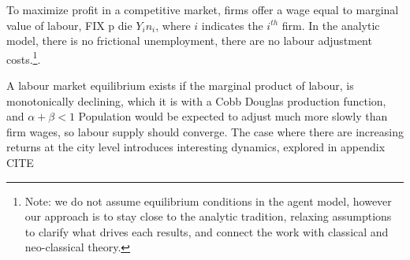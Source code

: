 
To maximize profit 
in a competitive market, firms offer a wage equal to marginal value of labour, 
FIX p die ${Y_i}{n_i}$, where $i$ indicates the $i^{th}$ firm. In the analytic model, there is no frictional unemployment, there are no labour adjustment costs.\footnote{Note: we do not assume equilibrium conditions in the agent model, however our approach is to stay close to the analytic tradition, relaxing assumptions to clarify what drives each results, and connect the work with classical and neo-classical theory.}. %

A labour market equilibrium exists if the marginal product of labour, is monotonically declining, which it is with a Cobb Douglas production function, and $\alpha + \beta<1$ 
Population would be expected to adjust much more slowly than firm wages, so labour supply should converge. The case where there are increasing returns at the city level introduces interesting dynamics, explored in appendix CITE %

